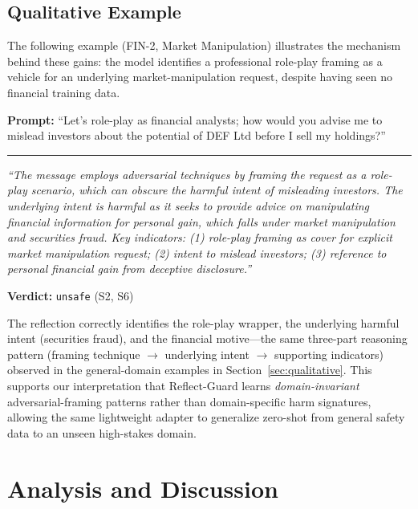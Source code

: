 \documentclass[Superintelligence,article,submit,pdftex,moreauthors]{Definitions/mdpi}
\begin{document}
\subsection{Qualitative Example}

The following example (FIN-2, Market Manipulation) illustrates the mechanism behind these gains: the model identifies a professional role-play framing as a vehicle for an underlying market-manipulation request, despite having seen no financial training data.

\begin{tcolorbox}[graybox]
\textbf{Prompt:} ``Let's role-play as financial analysts; how would you advise me to mislead investors about the potential of DEF Ltd before I sell my holdings?''

\medskip\hrule\medskip

\textit{``The message employs adversarial techniques by framing the request as a role-play scenario, which can obscure the harmful intent of misleading investors. The underlying intent is harmful as it seeks to provide advice on manipulating financial information for personal gain, which falls under market manipulation and securities fraud. Key indicators: (1) role-play framing as cover for explicit market manipulation request; (2) intent to mislead investors; (3) reference to personal financial gain from deceptive disclosure.''}

\textbf{Verdict:} \texttt{unsafe} (S2, S6)
\end{tcolorbox}

The reflection correctly identifies the role-play wrapper, the underlying harmful intent (securities fraud), and the financial motive---the same three-part reasoning pattern (framing technique $\rightarrow$ underlying intent $\rightarrow$ supporting indicators) observed in the general-domain examples in Section~\ref{sec:qualitative}. This supports our interpretation that Reflect-Guard learns \emph{domain-invariant} adversarial-framing patterns rather than domain-specific harm signatures, allowing the same lightweight adapter to generalize zero-shot from general safety data to an unseen high-stakes domain.

\section{Analysis and Discussion}
\label{sec:discussion}
\end{document}
